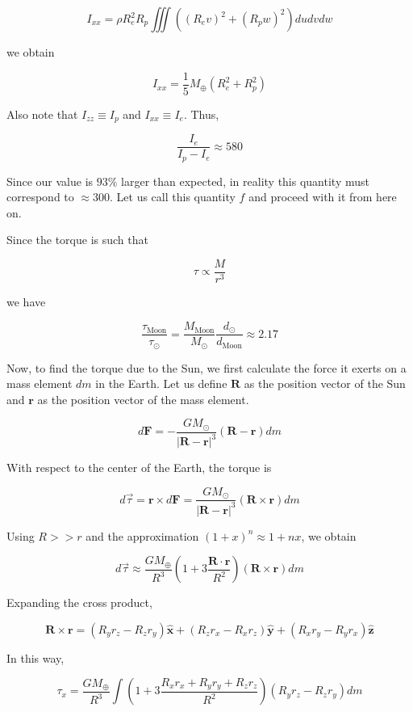 \documentclass[11pt]{article}
\begin{document}
\begin{pproblem}
\begin{pssolution*}{}{}
\begin{alternativas}
            \[I_{xx} = \rho R_e^2R_p\iiint ((R_ev)^2+(R_pw)^2)dudvdw\]

            we obtain

            \[I_{xx} = \frac{1}{5}M_\oplus(R_e^2+R_p^2)\]

            Also note that \(I_{zz} \equiv I_p\) and \(I_{xx}\equiv I_e\). Thus,

            \[\boxed{\frac{I_e}{I_p-I_e} \approx 580}\]

            Since our value is \(93\%\) larger than expected, in reality this quantity must correspond to \(\approx 300\). Let us call this quantity \(f\) and proceed with it from here on.

            \item Since the torque is such that
            
            \[\tau \propto \frac{M}{r^3}\]

            we have

            \[\frac{\tau_{\mathrm{Moon}}}{\tau_\odot} = \frac{M_{\mathrm{Moon}}}{M_\odot}\frac{d_\odot}{d_{\mathrm{Moon}}}\approx 2.17\]

            Now, to find the torque due to the Sun, we first calculate the force it exerts on a mass element \(dm\) in the Earth. Let us define \(\mathbf R\) as the position vector of the Sun and \(\mathbf r\) as the position vector of the mass element.

            \[d\mathbf F = -\frac{GM_\odot}{|\mathbf R - \mathbf r|^3}(\mathbf R - \mathbf r)dm\]

            With respect to the center of the Earth, the torque is

            \[d\vec\tau = \mathbf r \times d\mathbf F = \frac{GM_\odot}{|\mathbf R - \mathbf r|^3}(\mathbf R \times \mathbf r)dm\]

            Using \(R>>r\) and the approximation \((1+x)^n\approx 1+nx\), we obtain

            \[d\vec\tau \approx \frac{GM_\oplus}{R^3}\left(1+3\frac{\mathbf R \cdot \mathbf r}{R^2}\right)(\mathbf R \times \mathbf r )dm\]

            Expanding the cross product,

            \[\mathbf R \times \mathbf r = (R_yr_z - R_z r_y )\mathbf{\hat x} + (R_zr_x - R_xr_z)\mathbf {\hat y} + (R_xr_y - R_yr_x) \mathbf{\hat z}\]

            In this way,

            \[\tau_x = \frac{GM_\oplus}{R^3}\int \left(1+3\frac{R_xr_x+R_yr_y+R_zr_z}{R^2}\right)(R_yr_z-R_zr_y)dm\]


\end{alternativas}
\end{pssolution*}
\end{pproblem}
\end{document}
